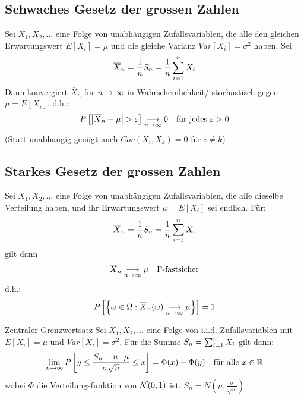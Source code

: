 \BoxEnd{}
\subsection{Schwaches Gesetz der grossen Zahlen}
Sei $X_1, X_2, \dots$ eine Folge von unabhängigen Zufallsvariablen, die alle
den gleichen Erwartungswert $E[X_i] = \mu$ und die gleiche Varianz $Var[X_i] =
  \sigma^2$ haben. Sei
\begin{align*}
  \overline{X}_n = \frac{1}{n} S_n = \frac{1}{n} \sum_{i = 1}^n X_i
\end{align*}
Dann konvergiert $\overline{X}_n$ für $n \rightarrow \infty$ in Wahrscheinlichkeit/
stochastisch gegen $\mu = E[X_i]$, d.h.:
\begin{align*}
  P \left[ \abs{\overline{X}_n - \mu} > \varepsilon \right] \underset{n \rightarrow \infty}{\longrightarrow} 0
   &  & \text{für jedes } \varepsilon > 0
\end{align*}
(Statt unabhängig genügt auch $Cov (X_i, X_k) = 0$ für $i \neq k$)
\subsection{Starkes Gesetz der grossen Zahlen}
Sei $X_1, X_2, \dots$ eine Folge von unabhängigen Zufallsvariablen, die alle
dieselbe Verteilung haben, und ihr Erwartungswert $\mu = E[X_i]$ sei endlich.
Für:
\begin{align*}
  \overline{X}_n = \frac{1}{n} S_n = \frac{1}{n} \sum_{i = 1}^n X_i
\end{align*}
gilt dann
\begin{align*}
  \overline{X}_n \underset{n \rightarrow \infty}{\longrightarrow} \mu &  & \text{P-fastsicher}
\end{align*}
d.h.:
\begin{align*}
  P \left[ \left\{ \omega \in \Omega : \overline{X}_n (\omega) \underset{n \rightarrow \infty}{\longrightarrow} \mu \right\} \right] = 1
\end{align*}
\begin{definition}{Zentraler Grenzwertsatz}
Sei $X_1, X_2, \dots$ eine Folge von i.i.d. Zufallsvariablen mit $E[X_i] = \mu$
und $Var[X_i] = \sigma^2$. Für die Summe $S_n = \sum_{i = 1}^n X_i$ gilt dann:
\begin{align*}
  \lim_{n \rightarrow \infty} P \left[y \leq \frac{S_n - n \cdot \mu}{\sigma \sqrt{n}} \leq x \right] = \Phi (x) - \Phi (y)
   &  & \text{für alle } x \in \mathbb{R}
\end{align*}
wobei $\Phi$ die Verteilungsfunktion von $\mathcal{N} (0, 1)$ ist. $S_n = N(\mu, \frac{\sigma}{\sqrt{n}})$
\end{definition}